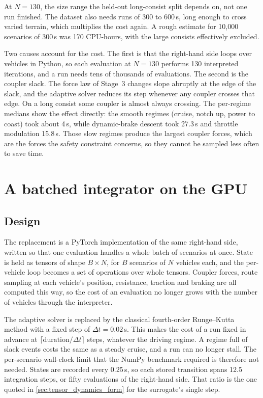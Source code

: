 At $N = 130$, the size range the held-out long-consist split depends on, not one run finished. The dataset also needs runs of 300 to 600\,s, long enough to cross varied terrain, which multiplies the cost again. A rough estimate for 10,000 scenarios of 300\,s was 170 CPU-hours, with the large consists effectively excluded.

Two causes account for the cost. The first is that the right-hand side loops over vehicles in Python, so each evaluation at $N = 130$ performs 130 interpreted iterations, and a run needs tens of thousands of evaluations. The second is the coupler slack. The force law of Stage~3 changes slope abruptly at the edge of the slack, and the adaptive solver reduces its step whenever any coupler crosses that edge. On a long consist some coupler is almost always crossing. The per-regime medians show the effect directly: the smooth regimes (cruise, notch up, power to coast) took about 4\,s, while dynamic-brake descent took 27.3\,s and throttle modulation 15.8\,s. Those slow regimes produce the largest coupler forces, which are the forces the safety constraint concerns, so they cannot be sampled less often to save time.

\section{A batched integrator on the GPU}
\label{sec:gpu_port}

\subsection{Design}

The replacement is a PyTorch implementation of the same right-hand side, written so that one evaluation handles a whole batch of scenarios at once. State is held as tensors of shape $B \times N$, for $B$ scenarios of $N$ vehicles each, and the per-vehicle loop becomes a set of operations over whole tensors. Coupler forces, route sampling at each vehicle's position, resistance, traction and braking are all computed this way, so the cost of an evaluation no longer grows with the number of vehicles through the interpreter.

The adaptive solver is replaced by the classical fourth-order Runge--Kutta method with a fixed step of $\Delta t = 0.02$\,s. This makes the cost of a run fixed in advance at $\lceil \text{duration}/\Delta t \rceil$ steps, whatever the driving regime. A regime full of slack events costs the same as a steady cruise, and a run can no longer stall. The per-scenario wall-clock limit that the NumPy benchmark required is therefore not needed. States are recorded every 0.25\,s, so each stored transition spans 12.5 integration steps, or fifty evaluations of the right-hand side. That ratio is the one quoted in \cref{sec:tensor_dynamics_form} for the surrogate's single step.

